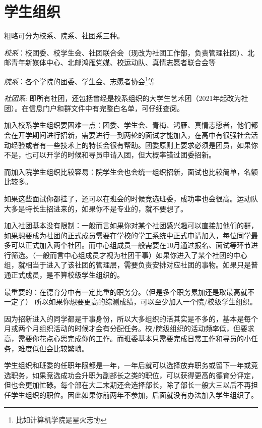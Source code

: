 \section{学生组织}


粗略可分为校系、院系、社团系三种。

\emph{校系}：校团委、校学生会、社团联合会（现改为社团工作部，负责管理社团）、北邮青年新媒体中心、北邮鸿雁党媒、校运动队、真情志愿者联合会等

\emph{院系}：各个学院的团委、学生会、志愿者协会\footnote{比如计算机学院是星火志协}等

\emph{社团系}: 即所有社团，还包括曾经是校系组织的大学生艺术团（2021年起改为社团）。在信息门户和群文件中有完整白名单，可仔细查阅。

加入校系学生组织要困难一点：团委、学生会、青梅、鸿雁、真情志愿者，他们都会在开学期间进行招新，需要进行一到两轮的面试才能加入，在高中有很强社会活动经验或者有一些技术上的特长会很有帮助。团委原则上要求必须是团员，如果你不是，也可以开学的时候和导员申请入团，但大概率错过团委招新。

而加入院学生组织比较容易：院学生会也会统一组织招新，面试也比较简单，名额比较多。

如果这些面试你都挂了，还可以在班会的时候竞选班委，成功率也会很高。运动队大多是特长生招进来的，如果你不是专业的，就不要想了。

加入社团基本没有限制：一般而言如果你对某个社团感兴趣可以直接加他们的群，如果想要成为社团的正式成员需要在学校的学工系统中正式申请加入，每位同学最多可以正式加入两个社团。而中心组成员一般需要在10月通过报名、面试等环节进行筛选。（一般而言中心组成员才视为社团干事）如果你进入了某个社团的中心组，就相当于进入了该社团的管理层，需要负责安排对应社团的事物。如果只是普通正式成员，是不算校级学生组织的。


最重要的：在德育分中有一定比重的职务分。（但是多个职务累加还是取最高就不一定了）
所以如果你想要更高的综测成绩，可以至少加入一个院/校级学生组织。

因为招新进入的同学都是干事身份，所以大多组织的活其实是不多的，基本是每个月或两个月组织活动的时候才会有分配任务。校/院级组织的活动频率低，但要求高，需要你花点心思完成你的工作。而班委基本只需要完成日常工作和导员的小任务，难度低但会比较繁琐。

学生组织和班委的任职年限都是一年，一年后就可以选择放弃职务或留下一年或竞选职务，如果竞选成功会升职为副部长之类的职位，可以获得更高的德育分评定，但也会更加忙碌。每个部在大二末期还会选择部长，除了部长一般大三以后不再担任学生组织的职位。因此如果你前两年不参加，后面就没有办法加入学生组织了。

